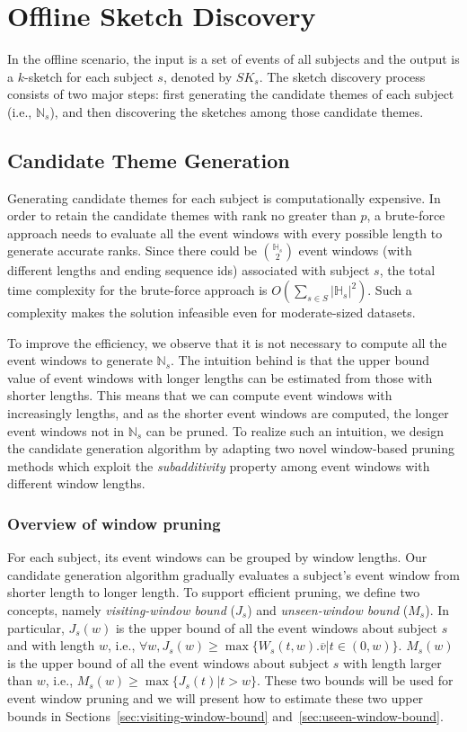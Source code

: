\section {Offline Sketch Discovery}\label{sec:offline}
In the offline scenario, the input is a set of events
of all subjects and the output is a $k$-sketch 
for each subject $s$, denoted by $SK_s$. 
The sketch discovery process consists of two 
major steps: first generating the candidate themes of each subject (i.e., $\mathbb{N}_s$), 
and then discovering the sketches among those candidate themes. 

\subsection{Candidate Theme Generation}
Generating candidate themes for each subject is computationally 
expensive. In order to retain the candidate themes with rank no greater than $p$,
a brute-force approach needs to evaluate all the event windows with every possible length to generate accurate ranks. Since there could be $\mathbb{H}_s \choose 2$ event windows (with different lengths and ending sequence ids) associated with subject $s$, the total time complexity for the brute-force approach
is $O(\sum_{s \in S}|\mathbb{H}_s|^2)$. Such a complexity makes the solution infeasible even for moderate-sized datasets.

To improve the efficiency, 
we observe that it is not necessary to compute all the event windows to generate $\mathbb{N}_s$.
The intuition behind is that the upper bound value of event windows with longer lengths can be estimated from those
with shorter lengths. This means that we can compute event windows with increasingly lengths, and as the shorter event windows are computed, the longer event windows not in $\mathbb{N}_s$ can be pruned.
To realize such an intuition, we design the candidate generation algorithm
by adapting two novel window-based pruning methods which 
exploit the \emph{subadditivity} property among event windows with different window lengths.


\subsubsection{Overview of window pruning}
For each subject, its event windows can be grouped by window lengths. Our candidate
generation algorithm gradually evaluates a subject's event window from shorter
length to longer length. To support efficient pruning, 
we define two concepts, namely \emph{visiting-window bound} ($J_s$) and \emph{unseen-window bound} ($M_s$).
In particular, $J_s(w)$ is the upper bound of all the event windows about subject $s$ and with length $w$, i.e., $\forall w,J_s(w) \geq \max\{W_s(t,w).\overline{v} | t\in(0,w)\}$. 
$M_s(w)$ is the upper bound of all the event windows about subject $s$ with length larger than $w$, i.e., $M_s(w) \geq \max\{J_s(t) | t > w\}$.  These two bounds will be used for event window pruning and we will present how to estimate these two upper bounds in Sections~\ref{sec:visiting-window-bound} and~\ref{sec:useen-window-bound}.

